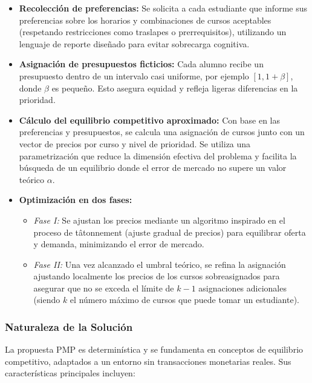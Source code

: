 \documentclass{article}
\begin{document}
\begin{itemize}
    \item \textbf{Recolección de preferencias:} Se solicita a cada estudiante que informe sus preferencias sobre los horarios y combinaciones de cursos aceptables (respetando restricciones como traslapes o prerrequisitos), utilizando un lenguaje de reporte diseñado para evitar sobrecarga cognitiva.
    
    \item \textbf{Asignación de presupuestos ficticios:} Cada alumno recibe un presupuesto dentro de un intervalo casi uniforme, por ejemplo $[1, 1 + \beta]$, donde $\beta$ es pequeño. Esto asegura equidad y refleja ligeras diferencias en la prioridad.
    
    \item \textbf{Cálculo del equilibrio competitivo aproximado:} Con base en las preferencias y presupuestos, se calcula una asignación de cursos junto con un vector de precios por curso y nivel de prioridad. Se utiliza una parametrización que reduce la dimensión efectiva del problema y facilita la búsqueda de un equilibrio donde el error de mercado no supere un valor teórico $\alpha$.
    
    \item \textbf{Optimización en dos fases:}
    \begin{itemize}
        \item \textit{Fase I:} Se ajustan los precios mediante un algoritmo inspirado en el proceso de tâtonnement (ajuste gradual de precios) para equilibrar oferta y demanda, minimizando el error de mercado.
        
        \item \textit{Fase II:} Una vez alcanzado el umbral teórico, se refina la asignación ajustando localmente los precios de los cursos sobreasignados para asegurar que no se exceda el límite de $k - 1$ asignaciones adicionales (siendo $k$ el número máximo de cursos que puede tomar un estudiante).
    \end{itemize}
\end{itemize}

\subsubsection{Naturaleza de la Solución}

La propuesta PMP es determinística y se fundamenta en conceptos de equilibrio competitivo, adaptados a un entorno sin transacciones monetarias reales. Sus características principales incluyen:
\end{document}
